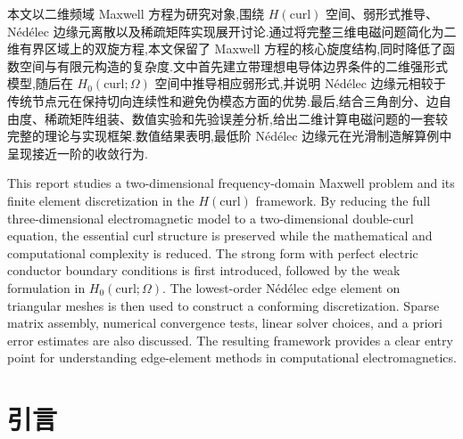 \documentclass[12pt,hyperref,a4paper,UTF8,twoside]{ctexart}
\begin{document}
\cover%
\thispagestyle{empty}
\newpage
\pagestyle{abstractcnstyle}
\begin{abstractcn}

本文以二维频域 Maxwell 方程为研究对象,围绕 $H(\text{curl})$ 空间、弱形式推导、Nédélec 边缘元离散以及稀疏矩阵实现展开讨论.通过将完整三维电磁问题简化为二维有界区域上的双旋方程,本文保留了 Maxwell 方程的核心旋度结构,同时降低了函数空间与有限元构造的复杂度.文中首先建立带理想电导体边界条件的二维强形式模型,随后在 $H_0(\text{curl};\Omega)$ 空间中推导相应弱形式,并说明 Nédélec 边缘元相较于传统节点元在保持切向连续性和避免伪模态方面的优势.最后,结合三角剖分、边自由度、稀疏矩阵组装、数值实验和先验误差分析,给出二维计算电磁问题的一套较完整的理论与实现框架.数值结果表明,最低阶 Nédélec 边缘元在光滑制造解算例中呈现接近一阶的收敛行为.

\end{abstractcn}

\newpage
\pagestyle{abstractenstyle}
\begin{abstracten}
This report studies a two-dimensional frequency-domain Maxwell problem and its finite element discretization in the $H(\text{curl})$ framework. By reducing the full three-dimensional electromagnetic model to a two-dimensional double-curl equation, the essential curl structure is preserved while the mathematical and computational complexity is reduced. The strong form with perfect electric conductor boundary conditions is first introduced, followed by the weak formulation in $H_0(\text{curl};\Omega)$. The lowest-order Nédélec edge element on triangular meshes is then used to construct a conforming discretization. Sparse matrix assembly, numerical convergence tests, linear solver choices, and a priori error estimates are also discussed. The resulting framework provides a clear entry point for understanding edge-element methods in computational electromagnetics.
\end{abstracten}

\newpage
\pagestyle{contentstyle}
\tableofcontents

\newpage
\pagestyle{articlestyle} %
\setcounter{page}{1}   %



\section{引言}
\end{document}
